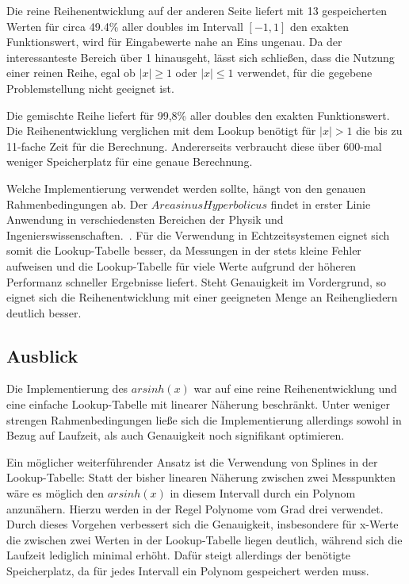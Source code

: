 \documentclass[course=erap] {aspdoc}
\begin{document}
    Die reine Reihenentwicklung auf der anderen Seite liefert mit 13 gespeicherten Werten für circa 49.4\% aller doubles im Intervall $[-1, 1]$ den exakten Funktionswert, wird für Eingabewerte nahe an Eins ungenau.
    Da der interessanteste Bereich über 1 hinausgeht, lässt sich schließen, dass die Nutzung einer reinen Reihe, egal ob $|x|\geq1$ oder $|x|\leq1$ verwendet, für die gegebene Problemstellung nicht geeignet ist.

    Die gemischte Reihe liefert für 99,8\% aller doubles den exakten Funktionswert.
    Die Reihenentwicklung verglichen mit dem Lookup benötigt für $|x|>1$ die bis zu 11-fache Zeit für die Berechnung.
    Andererseits verbraucht diese über 600-mal weniger Speicherplatz für eine genaue Berechnung.

    Welche Implementierung verwendet werden sollte, hängt von den genauen Rahmenbedingungen ab.
    Der $Areasinus Hyperbolicus$ findet in erster Linie Anwendung in verschiedensten Bereichen der Physik und Ingenierswissenschaften.~\cite{????}.
    Für die Verwendung in Echtzeitsystemen eignet sich somit die Lookup-Tabelle besser, da Messungen in der stets kleine Fehler aufweisen und die Lookup-Tabelle für viele Werte aufgrund der höheren Performanz schneller Ergebnisse liefert.
    Steht Genauigkeit im Vordergrund, so eignet sich die Reihenentwicklung mit einer geeigneten Menge an Reihengliedern deutlich besser.

    \subsection{Ausblick}\label{subsec:ausblick}

    Die Implementierung des $arsinh(x)$ war auf eine reine Reihenentwicklung und eine einfache Lookup-Tabelle mit linearer Näherung beschränkt.
    Unter weniger strengen Rahmenbedingungen ließe sich die Implementierung allerdings sowohl in Bezug auf Laufzeit, als auch Genauigkeit noch signifikant optimieren.

    Ein möglicher weiterführender Ansatz ist die Verwendung von Splines in der Lookup-Tabelle:
    Statt der bisher linearen Näherung zwischen zwei Messpunkten wäre es möglich den $arsinh(x)$ in diesem Intervall durch ein Polynom anzunähern.
    Hierzu werden in der Regel Polynome vom Grad drei verwendet.~\cite{????}
    Durch dieses Vorgehen verbessert sich die Genauigkeit, insbesondere für x-Werte die zwischen zwei Werten in der Lookup-Tabelle liegen deutlich, während sich die Laufzeit lediglich minimal erhöht.
    Dafür steigt allerdings der benötigte Speicherplatz, da für jedes Intervall ein Polynom gespeichert werden muss.
\end{document}
